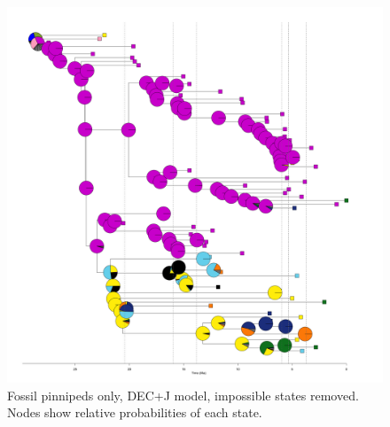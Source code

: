 \documentclass[a4paper, 12pt]{article}
\begin{document}
\begin{figure}[H]
 \centering
  \includegraphics[width = \linewidth]{figures/fossil-pinnipeds-DECj-impossible-pies.png}
  \caption{Fossil pinnipeds only, DEC+J model, impossible states removed. Nodes show relative probabilities of each state.}
  \label{fig-fossil-decj-pie}
\end{figure} 
 
\end{document}
